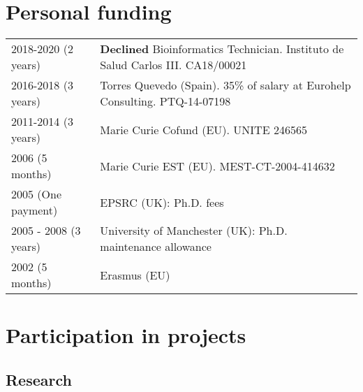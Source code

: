 \documentclass[11pt,fullpage]{article}
\begin{document}
\section*{Personal funding}

\begin{tabular}{ll}
  2018-2020 (2 years) & {\bf Declined} Bioinformatics Technician. Instituto de Salud Carlos III. CA18/00021 \\
  2016-2018 (3 years) & Torres Quevedo (Spain). 35\% of salary at Eurohelp Consulting. PTQ-14-07198 \\
	2011-2014 (3 years) & Marie Curie Cofund (EU). UNITE 246565 \\
	2006 (5 months) & Marie Curie EST (EU). MEST-CT-2004-414632 \\
	2005 (One payment) & EPSRC (UK): Ph.D. fees \\
	2005 - 2008 (3 years) & University of Manchester (UK): Ph.D. maintenance allowance \\
	2002 (5 months) & Erasmus (EU) \\
\end{tabular}

\section*{Participation in projects}

\subsection*{Research}
\end{document}
